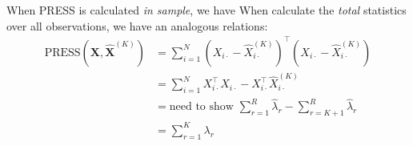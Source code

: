 When PRESS is calculated \emph{in sample}, we have
When calculate the \emph{total} statistics over all observations, we have an analogous relations:
\begin{align*}
     \text{PRESS}\left(\mathbf{X}, \widehat{\mathbf{X}}^{(K)}\right) &= \sum_{i=1}^N \left(X_{i\cdot} - \widehat{X}^{(K)}_{i\cdot}\right)^\top \left(X_{i\cdot} - \widehat{X}^{(K)}_{i\cdot}\right) \\
     &= \sum_{i=1}^N X_{i\cdot}^\top X_{i\cdot} - X_{i\cdot}^\top \widehat{X}^{(K)}_{i\cdot} \\
     &= \text{need to show } \sum_{r=1}^R \widehat{\lambda}_r  - \sum_{r=K+1}^R \widehat{\lambda}_r  \\
     &= \sum_{r=1}^K \lambda_r
\end{align*}